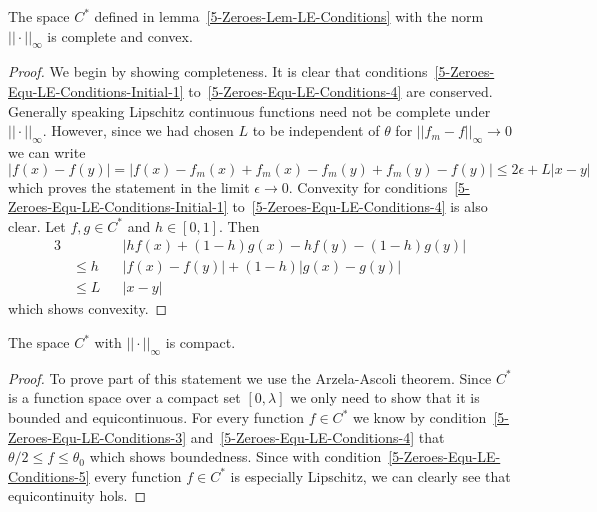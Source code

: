 \begin{lemma}
	The space $C^*$ defined in lemma~\ref{5-Zeroes-Lem-LE-Conditions} with the norm $||\cdot||_\infty$ is complete and convex.
	\label{5-Zeroes-Lem-LE-Convex-Complete}
\end{lemma}
\begin{proof}
	We begin by showing completeness.
	It is clear that conditions~\eqref{5-Zeroes-Equ-LE-Conditions-Initial-1} to~\eqref{5-Zeroes-Equ-LE-Conditions-4} are conserved.
	Generally speaking Lipschitz continuous functions need not be complete under $||\cdot||_\infty$.
	However, since we had chosen $L$ to be independent of $\theta$ for $||f_m-f||_\infty\rightarrow0$ we can write
	\begin{equation}
		|f(x)-f(y)|=|f(x)-f_m(x)+f_m(x)-f_m(y)+f_m(y)-f(y)|\leq 2\epsilon+L|x-y|
		\label{eq:5-Zeroes-LE-Equicontinuity-Proof}
	\end{equation}
	which proves the statement in the limit $\epsilon\rightarrow0$.
	Convexity for conditions~\eqref{5-Zeroes-Equ-LE-Conditions-Initial-1} to~\eqref{5-Zeroes-Equ-LE-Conditions-4} is also clear.
	Let $f,g\in C^*$ and $h\in[0,1]$.
	Then
	\begin{alignat}{3}
		&&&|hf(x)+(1-h)g(x)-hf(y)-(1-h)g(y)|\\
		&\leq h&&|f(x)-f(y)|+ (1-h)|g(x)-g(y)|\\
		&\leq L&&|x-y|
	\end{alignat}
	which shows convexity.
\end{proof}\noindent
\begin{lemma}
	The space $C^*$ with $||\cdot||_\infty$ is compact.
	\label{5-Zeroes-Lem-LE-Compact}
\end{lemma}
\begin{proof}
	To prove part of this statement we use the Arzela-Ascoli theorem.
	Since $C^*$ is a function space over a compact set $[0,\lambda]$ we only need to show that it is bounded and equicontinuous.
	For every function $f\in C^*$ we know by condition~\eqref{5-Zeroes-Equ-LE-Conditions-3} and~\eqref{5-Zeroes-Equ-LE-Conditions-4} that $\theta/2\leq f\leq\theta_0$ which shows boundedness.
	Since with condition~\eqref{5-Zeroes-Equ-LE-Conditions-5} every function $f\in C^*$ is especially Lipschitz, we can clearly see that equicontinuity hols.
\end{proof}
